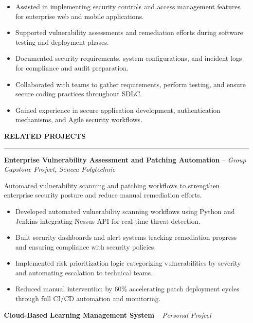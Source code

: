 \documentclass[10pt,letterpaper]{article}
\begin{document}
\begin{itemize}
\item Assisted in implementing security controls and access management features for enterprise web and mobile applications.
\item Supported vulnerability assessments and remediation efforts during software testing and deployment phases.
\item Documented security requirements, system configurations, and incident logs for compliance and audit preparation.
\item Collaborated with teams to gather requirements, perform testing, and ensure secure coding practices throughout SDLC.
\item Gained experience in secure application development, authentication mechanisms, and Agile security workflows.
\end{itemize}

\vspace{6pt}

\textbf{RELATED PROJECTS}\\[-8pt]
\noindent\rule{\textwidth}{1pt}

\vspace{-2pt}

\textbf{Enterprise Vulnerability Assessment and Patching Automation} -- \emph{Group Capstone Project, Seneca Polytechnic }

\vspace{-1pt}

Automated vulnerability scanning and patching workflows to strengthen enterprise security posture and reduce manual remediation efforts.
\vspace{-1pt}
\begin{itemize}
\item Developed automated vulnerability scanning workflows using Python and Jenkins integrating Nessus API for real-time threat detection.
\item Built security dashboards and alert systems tracking remediation progress and ensuring compliance with security policies.
\item Implemented risk prioritization logic categorizing vulnerabilities by severity and automating escalation to technical teams.
\item Reduced manual intervention by 60\% accelerating patch deployment cycles through full CI/CD automation and monitoring.
\end{itemize}

\textbf{Cloud-Based Learning Management System} -- \emph{Personal Project}
\end{document}
